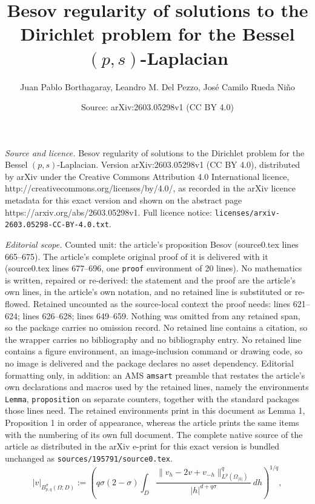 \documentclass[10pt,a4paper]{amsart}
\title{Besov regularity of solutions to the Dirichlet problem for the Bessel \( (p,s) \)-Laplacian}
\author{Juan Pablo Borthagaray, Leandro M. Del Pezzo, Jos\'e Camilo Rueda Ni\~no}
\date{Source: arXiv:2603.05298v1 (CC BY 4.0)}
\begin{document}
\maketitle

\noindent\emph{Source and licence.} Besov regularity of solutions to the Dirichlet problem for the Bessel \( (p,s) \)-Laplacian. Version arXiv:2603.05298v1 (CC BY 4.0), distributed by arXiv under the Creative Commons Attribution 4.0 International licence, http://creativecommons.org/licenses/by/4.0/, as recorded in the arXiv licence metadata for this exact version and shown on the abstract page https://arxiv.org/abs/2603.05298v1. Full licence notice: \texttt{licenses/arxiv-2603.05298-CC-BY-4.0.txt}.\par\smallskip

\noindent\textit{Editorial scope.} Counted unit: the article's proposition Besov (source0.tex lines 665--675). The article's complete original proof of it is delivered with it (source0.tex lines 677--696, one \texttt{proof} environment of 20 lines). No mathematics is written, repaired or re-derived: the statement and the proof are the article's own lines, in the article's own notation, and no retained line is substituted or re-flowed.  Retained uncounted as the source-local context the proof needs: lines 621--624; lines 626--628; lines 649--659.  Nothing was omitted from any retained span, so the package carries no omission record.  No retained line contains a citation, so the wrapper carries no bibliography and no bibliography entry.  No retained line contains a figure environment, an image-inclusion command or drawing code, so no image is delivered and the package declares no asset dependency.  Editorial formatting only, in addition: an AMS \texttt{amsart} preamble that restates the article's own declarations and macros used by the retained lines, namely the environments \texttt{Lemma}, \texttt{proposition} on separate counters, together with the standard packages those lines need.  The retained environments print in this document as Lemma 1, Proposition 1 in order of appearance, whereas the article prints the same items with the numbering of its own full document.  The complete native source of the article as distributed in the arXiv e-print for this exact version is bundled unchanged as \texttt{sources/195791/source0.tex}.
\begin{equation}
\label{eq: Regularidad-Norma-Besov}
    	|v|_{B_{p, q}^{\sigma}(\Omega; D)} := \left(q \sigma(2-\sigma) \int_{D} \frac{\|v_h - 2v + v_{-h}\|_{L^{p}(\Omega_{|h|})}^{q}}{|h|^{d + q\sigma}} \, dh\right)^{1/q},
\end{equation}
\end{document}
